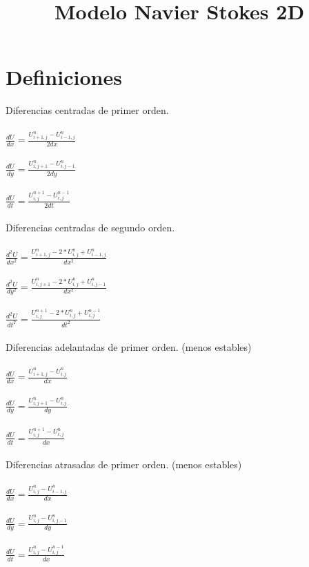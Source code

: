 \documentclass[a4paper]{article}
\title{Modelo Navier Stokes 2D}
\author{}
\begin{document}
\maketitle
\section{Definiciones}
Diferencias centradas de primer orden.
\\
\\
$\frac{dU}{dx} = \frac{U^{n}_{i+1,j} - U^{n}_{i-1,j}}{2dx} $
\\
\\
$\frac{dU}{dy} = \frac{U^{n}_{i,j+1} - U^{n}_{i,j-1}}{2dy} $
\\
\\
$\frac{dU}{dt} = \frac{U^{n+1}_{i,j} - U^{n-1}_{i,j}}{2dt} $
\\
\\
Diferencias centradas de segundo orden.
\\
\\
$\frac{d^{2}U}{dx^{2}} = \frac{ U^{n}_{i+1,j} - 2*U^{n}_{i,j} + U^{n}_{i-1,j}}{dx^2}$
\\
\\
$\frac{d^{2}U}{dy^{2}} = \frac{ U^{n}_{i,j+1} - 2*U^{n}_{i,j} + U^{n}_{i,j-1}}{dx^2}$
\\
\\
$\frac{d^{2}U}{dt^{2}} = \frac{ U^{n+1}_{i,j} - 2*U^{n}_{i,j} + U^{n-1}_{i,j}}{dt^2}$
\\
\\

Diferencias adelantadas de primer orden. (menos estables)
\\
\\
$\frac{dU}{dx} = \frac{U^{n}_{i+1,j} - U^{n}_{i,j}}{dx} $
\\
\\
$\frac{dU}{dy} = \frac{U^{n}_{i,j+1} - U^{n}_{i,j}}{dy} $
\\
\\
$\frac{dU}{dt} = \frac{U^{n+1}_{i,j} - U^{n}_{i,j}}{dx} $
\\
\\

Diferencias atrasadas de primer orden. (menos estables)
\\
\\
$\frac{dU}{dx} = \frac{U^{n}_{i,j} - U^{n}_{i-1,j}}{dx} $
\\
\\
$\frac{dU}{dy} = \frac{U^{n}_{i,j} - U^{n}_{i,j-1}}{dy} $
\\
\\
$\frac{dU}{dt} = \frac{U^{n}_{i,j} - U^{n-1}_{i,j}}{dx} $
\\
\\
\end{document}
